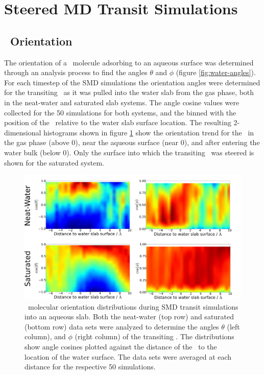\section{Steered MD Transit Simulations}

\subsection {\suldiox~Orientation}

	The orientation of a \suldiox~molecule adsorbing to an aqueous surface was determined through an analysis process to find the angles $\theta$ and $\phi$ (figure \ref{fig:water-angles}). For each timestep of the SMD simulations the orientation angles were determined for the transiting \suldiox~as it was pulled into the water slab from the gas phase, both in the neat-water and saturated slab systems. The angle cosine values were collected for the 50 simulations for both systems, and the binned with the position of the \suldiox~relative to the water slab surface location. The resulting 2-dimensional histograms shown in figure \ref{fig:so2-transit-angles} show the orientation trend for the \suldiox~in the gas phase (above 0\angs), near the aqueous surface (near 0\angs), and after entering the water bulk (below 0\angs). Only the surface into which the transiting \suldiox~was steered is shown for the saturated system.

\begin{figure}[h!]
	\begin{center}
		\includegraphics[scale=1.0]{images/so2-angles/so2-angles-transit.png}
		\caption{\suldiox~molecular orientation distributions during SMD transit simulations into an aqueous slab. Both the neat-water (top row) and saturated (bottom row) data sets were analyzed to determine the angles $\theta$ (left column), and $\phi$ (right column) of the transiting \suldiox. The distributions show angle cosines plotted against the distance of the \suldiox~to the location of the water surface. The data sets were averaged at each distance for the respective 50 simulations.}
		\label{fig:so2-transit-angles}
	\end{center}
\end{figure}

